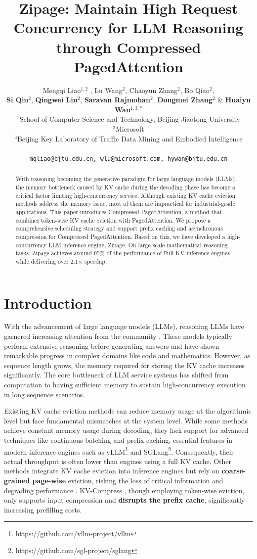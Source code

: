 \documentclass[11pt]{article}
\title{Zipage: Maintain High Request Concurrency for LLM Reasoning through Compressed PagedAttention}
\author{
Mengqi Liao$^{1,2}$ , Lu Wang$^{2}$, Chaoyun Zhang$^{2}$, Bo Qiao$^{2}$, \\
\textbf{Si Qin}$^{2}$, \textbf{Qingwei Lin}$^{2}$, \textbf{Saravan Rajmohan}$^{2}$, \textbf{Dongmei Zhang}$^{2}$ \& \textbf{Huaiyu Wan}$^{1,3,*}$
\\
$^1$School of Computer Science and Technology, Beijing Jiaotong University \\
$^2$Microsoft  \\
$^3$Beijing Key Laboratory of Traffic Data Mining and Embodied Intelligence \\
\\
\texttt{mqliao@bjtu.edu.cn, wlu@microsoft.com, hywan@bjtu.edu.cn} 
}
\begin{document}
\maketitle
\begin{abstract}

With reasoning becoming the generative paradigm for large language models (LLMs),  the memory bottleneck caused by KV cache during the decoding phase has become a critical factor limiting high-concurrency service. Although existing KV cache eviction methods address the memory issue, most of them are impractical for industrial-grade applications. This paper introduces Compressed PagedAttention, a method that combines token-wise KV cache eviction with PagedAttention. We propose a comprehensive scheduling strategy and support prefix caching and asynchronous compression for Compressed PagedAttention. Based on this, we have developed a high-concurrency LLM inference engine, Zipage. On large-scale mathematical reasoning tasks, Zipage achieves around 95\% of the performance of Full KV inference engines while delivering over 2.1$\times$ speedup.

\end{abstract}

\section{Introduction}

With the advancement of large language models (LLMs), reasoning LLMs have garnered increasing attention from the community \citep{ke2025survey,li2025system}. These models typically perform extensive reasoning before generating answers and have shown remarkable progress in complex domains like code and mathematics. However, as sequence length grows, the memory required for storing the KV cache increases significantly. The core bottleneck of LLM service systems has shifted from computation to having sufficient memory to sustain high-concurrency execution in long sequence scenarios.

Existing KV cache eviction methods can reduce memory usage at the algorithmic level but face fundamental mismatches at the system level. While some methods \citep{morghkv,rkv,gkv} achieve constant memory usage during decoding, they lack support for advanced techniques like continuous batching and prefix caching, essential features in modern inference engines such as vLLM\footnote{https://github.com/vllm-project/vllm} and SGLang\footnote{https://github.com/sgl-project/sglang}. Consequently, their actual throughput is often lower than engines using a full KV cache. Other methods integrate KV cache eviction into inference engines but rely on \textbf{coarse-grained page-wise} eviction, risking the loss of critical information and degrading performance \cite{raas, pagedeviction}. KV-Compress \citep{rehg2024kv}, though employing token-wise eviction, only supports input compression and \textbf{disrupts the prefix cache}, significantly increasing prefilling costs.
\end{document}
